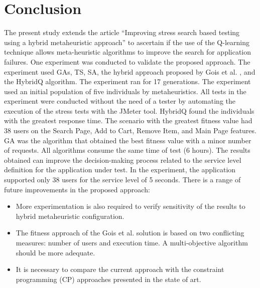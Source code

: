 \documentclass{bmcart}
\begin{document}
\section{Conclusion}

The present study extends the article ``Improving stress search based testing using a hybrid metaheuristic approach'' to ascertain if the use of the Q-learning technique allows meta-heuristic algorithms to improve the search for application failures. One experiment was conducted to validate the proposed approach. The experiment used GAs, TS, SA, the hybrid approach proposed by Gois et al. \citep{Gois2016}, and the HybridQ algorithm. The experiment ran for 17 generations. The experiment used an initial population of five individuals by metaheuristics. All tests in the experiment were conducted without the need of a tester by automating the execution of the stress tests with the JMeter tool.  HybridQ found the individuals with the greatest response time. The scenario with the greatest fitness value had 38 users on the Search Page, Add to Cart, Remove Item, and Main Page features. GA was the algorithm that obtained the best fitness value with a minor number of requests. All algorithms consume the same time of test (6 hours). The results obtained can improve the decision-making process related to the service level definition for the application under test. In the experiment, the application supported only 38 users for the service level of 5 seconds. There is a range of future improvements in the proposed approach:

\begin{itemize}
\item More experimentation is also required to verify sensitivity of the results to  hybrid metaheuristic configuration. 
\item The fitness approach of the Gois et al. solution is based on two conflicting measures: number of users and execution time. A multi-objective algorithm should be more adequate. 
\item It is necessary to compare the current approach with the constraint programming (CP) approaches presented in the state of art.

\end{itemize}




\end{document}

